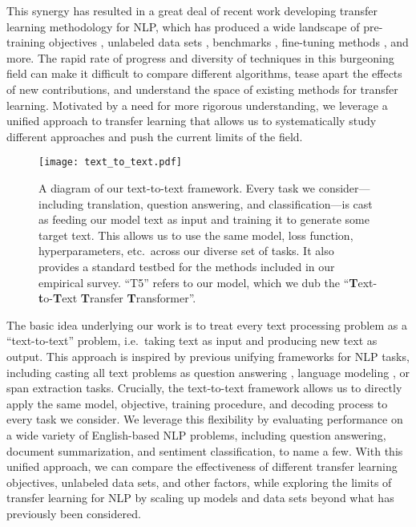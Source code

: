 \documentclass[twoside,11pt]{article}
\begin{document}
This synergy has resulted in a great deal of recent work developing transfer learning methodology for NLP, which has produced a wide landscape of pre-training objectives \citep{howard2018universal,devlin2018bert,yang2019xlnet,dong2019unified}, unlabeled data sets \citep{yang2019xlnet,liu2019roberta,zellers2019defending}, benchmarks \citep{wang2019superglue,wang2018glue,conneau2018senteval}, fine-tuning methods \citep{howard2018universal,houlsby2019parameter,peters2019tune}, and more.
The rapid rate of progress and diversity of techniques in this burgeoning field can make it difficult to compare different algorithms, tease apart the effects of new contributions, and understand the space of existing methods for transfer learning.
Motivated by a need for more rigorous understanding, we leverage a unified approach to transfer learning that allows us to systematically study different approaches and push the current limits of the field.

\begin{figure}[t]
    \centering
    \texttt{[image: text\_to\_text.pdf]}
    \caption{
    A diagram of our text-to-text framework.
    Every task we consider---including translation, question answering, and classification---is cast as feeding our model text as input and training it to generate some target text.
    This allows us to use the same model, loss function, hyperparameters, etc.\ across our diverse set of tasks.
    It also provides a standard testbed for the methods included in our empirical survey.
    ``T5'' refers to our model, which we dub the ``\textbf{T}ext-\textbf{t}o-\textbf{T}ext \textbf{T}ransfer \textbf{T}ransformer''.
    }
    \label{fig:text_to_text}
\end{figure}

The basic idea underlying our work is to treat every text processing problem as a ``text-to-text'' problem, i.e.\ taking text as input and producing new text as output.
This approach is inspired by previous unifying frameworks for NLP tasks, including casting all text problems as question answering  \citep{mccann2018natural}, language modeling \citep{radford2019language}, or span extraction \cite{keskar2019unifying} tasks.
Crucially, the text-to-text framework allows us to directly apply the same model, objective, training procedure, and decoding process to every task we consider.
We leverage this flexibility by evaluating performance on a wide variety of English-based NLP problems, including question answering, document summarization, and sentiment classification, to name a few.
With this unified approach, we can compare the effectiveness of different transfer learning objectives, unlabeled data sets, and other factors, while exploring the limits of transfer learning for NLP by scaling up models and data sets beyond what has previously been considered.
\end{document}
